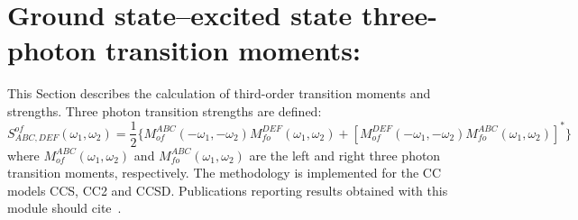 
\section{Ground state--excited state three-photon 
transition moments: }\label{sec:cctm}

This Section describes the calculation of third-order transition
moments and strengths. Three photon transition strengths are defined:
{\small \[
S^{of}_{ABC,DEF}(\omega_1,\omega_2) = \frac{1}{2} 
       \{ M^{ABC}_{of}(-\omega_1,-\omega_2) M^{DEF}_{fo}(\omega_1,\omega_2)
        +[M^{DEF}_{of}(-\omega_1,-\omega_2) M^{ABC}_{fo}(\omega_1,\omega_2)]^\ast\}
\] }
where $M^{ABC}_{of}(\omega_1,\omega_2)$ and $M^{ABC}_{fo}(\omega_1,\omega_2)$
are the left and right three photon transition moments, respectively.
The methodology is implemented for the CC models CCS, CC2 and CCSD.
Publications reporting results obtained with this module should 
cite~\cite{Haettig:MULTIPHOTON}.

